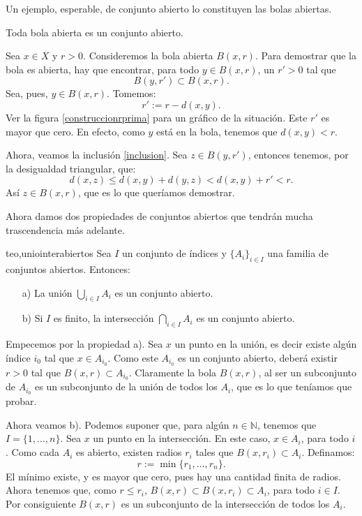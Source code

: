 Un ejemplo, esperable, de conjunto abierto lo constituyen las
bolas abiertas.
\begin{proposicion}{} Toda bola abierta es un conjunto abierto.
\end{proposicion}
\begin{demo} 
Sea $x\in X$ y $r>0$. Consideremos la bola abierta
$B(x,r)$. Para demostrar que la bola es abierta, hay que
encontrar, para todo $y\in B(x,r)$, un $r'>0$ tal que
\begin{equation}\label{inclusion}
	B(y,r')\subset B(x,r).
\end{equation}
Sea, pues, $y\in B(x,r)$. Tomemos:
\[r':=r-d(x,y).\]
Ver la figura \vref{construccionrprima} para un gráfico de la
situación. Este $r'$ es mayor que cero. En efecto, como $y$
está en la bola, tenemos que $d(x,y)<r$.




Ahora, veamos la inclusión \vref{inclusion}. Sea $z\in B(y,r')$,
entonces tenemos, por la desigualdad triangular, que:
\[d(x,z)\leq d(x,y)+d(y,z)< d(x,y)+r'<r.\]
Así $z\in B(x,r)$, que es lo que queríamos demostrar.
\end{demo}

Ahora damos dos propiedades de conjuntos abiertos que tendrán
mucha trascendencia más adelante.
\begin{teorema}{teo,uniointerabiertos} Sea $I$ un conjunto de índices y
$\{A_i\}_{i\in I}$ una familia de conjuntos abiertos. Entonces:
\begin{itemize}
\item[a)] La unión $\bigcup_{i\in I}A_i$ es un conjunto abierto.
\item[b)] Si $I$ es finito, la intersección $\bigcap_{i\in
I}A_i$ es un conjunto abierto.
\end{itemize}
\end{teorema}
\begin{demo} Empecemos por la propiedad a). Sea $x$ un punto en la
unión, es decir existe algún índice $i_0$ tal que $x\in
A_{i_0}$. Como este $A_{i_0}$ es un conjunto abierto, deberá
existir $r>0$ tal que $B(x,r)\subset A_{i_0}$. Claramente la bola
$B(x,r)$, al ser un subconjunto de $A_{i_0}$ es un subconjunto de
la unión de todos los $A_i$, que es lo que teníamos que
probar.

Ahora veamos b). Podemos suponer que, para algún $n\in
\mathbb{N}$, tenemos que $I=\{1,\dots,n\}$. Sea $x$ un punto en la
intersección. En este caso, $x\in A_i$, para todo $i$. Como cada
$A_i$ es abierto, existen radios $r_i$ tales que $B(x,r_i)\subset
A_i$. Definamos:
\[
	r:=\min\{r_1,\dots,r_n\}.
\]
El mínimo existe, y es mayor que cero, pues hay una cantidad
finita de radios. Ahora tenemos que, como $r\leq r_i$,
$B(x,r)\subset B(x,r_i)\subset A_i$, para todo $i\in I$. Por
consiguiente $B(x,r)$ es un subconjunto de la intersección de
todos los $A_i$.
\end{demo}

